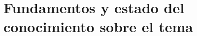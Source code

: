 \section{Fundamentos y estado del conocimiento sobre el tema}
\iffalse
Escriba una breve introducción general al tema y cite y comente las mayores
contribuciones en el tema específico, incluyendo bibliografıa actualizada.
\fi
